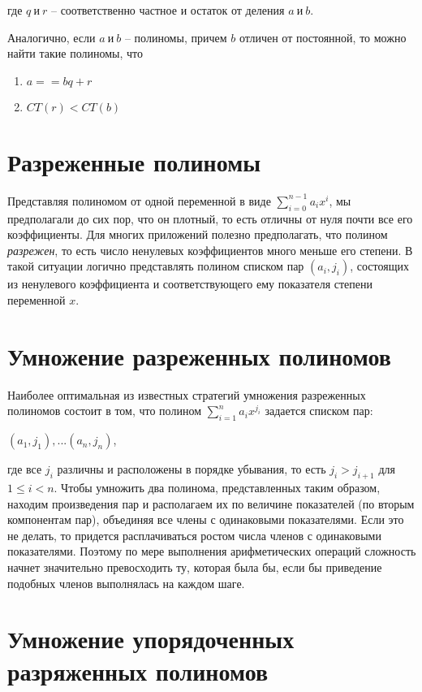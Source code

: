 \documentclass[bachelor, och, labwork]{shiza}
\begin{document}
где $q ~\text{и}~ r$ -- соответственно частное и остаток от деления $a ~\text{и}~ b$.

Аналогично, если $a ~\text{и}~ b$ -- полиномы, причем $b$ отличен от постоянной,
то можно найти такие полиномы, что
\begin{enumerate}
    \item $a==bq+r$
    \item $CT(r)<CT(b)$
\end{enumerate}

\section{Разреженные полиномы}
Представляя полиномом от одной переменной в виде $\sum\limits_{i=0}^{n-1}{a_ix^i}$,
мы предполагали до сих пор, что он плотный, то есть отличны от нуля почти все 
его коэффициенты. Для многих приложений полезно предполагать, что полином
\textit{разрежен}, то есть число ненулевых коэффициентов много меньше его степени.
В такой ситуации логично представлять полином списком пар $(a_i, j_i)$, состоящих
из ненулевого коэффициента и соответствующего ему показателя степени переменной
$x$. 

\section{Умножение разреженных полиномов}

Наиболее оптимальная из известных стратегий умножения разреженных \\полиномов
состоит в том, что полином $\sum\limits_{i=1}^n{a_ix^{j_i}}$ задается списком пар:
\begin{center}$(a_1,j_1),...(a_n,j_n)$,\end{center}
где все $j_i$ различны и расположены в порядке убывания,
то есть $j_i>j_{i+1}$ для $1\leq i < n$. Чтобы умножить два полинома,
представленных таким образом, находим произведения пар и располагаем их по
величине показателей (по вторым компонентам пар), объединяя все члены с одинаковыми
показателями. Если это не делать, то придется расплачиваться ростом числа членов
с одинаковыми показателями. Поэтому по мере выполнения арифметических операций
сложность начнет значительно превосходить ту, которая была бы, если бы приведение
подобных членов выполнялась на каждом шаге.

\section{Умножение упорядоченных разряженных полиномов}
\end{document}
